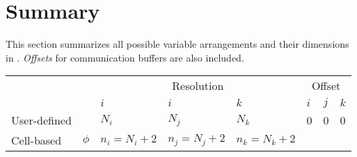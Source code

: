 \clearpage
\section{Summary}
\label{sec:summary}

This section summarizes all possible variable arrangements and their dimensions
in {\psiboil}. {\em Offsets} for communication buffers are also included. 

\begin{large}
\begin{center}
\begin{tabular}{ l l|l|l|l|l|l|l|}
  \cline{3-8}
      &                                                        %
          & \multicolumn{3}{c|}{\sf Resolution}                %
              & \multicolumn{3}{c|}{\sf Offset}            \\  %
      &                                                        %
          &   $i$   &   $i$   &   $k$                          %
              &   $i$   &   $j$   &   $k$                  \\  %
  \cline{3-8} %
  \hline      %
  \multicolumn{1}{|l}{\sf User-defined}                        %
      &                                                        %
          &   $N_i$   &   $N_j$   &   $N_k$                    %
              &   0   &   0   &   0                        \\  %
  \hline      %
  \hline      %
  \multicolumn{1}{|l}{\sf Cell-based}                          %
      &   $\phi$                                               %
          &   $n_i=N_i+2$   &   $n_j=N_j+2$   &   $n_k=N_k+2$  %

\end{tabular}
\end{center}
\end{large}
